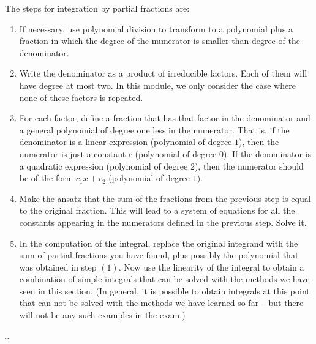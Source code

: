 \begin{remark}
The steps for integration by partial fractions are:
\begin{enumerate}[(1)]
	\item If necessary, use polynomial division to transform to a polynomial plus a fraction in which the degree of the numerator is smaller than degree of the denominator.
	\item Write the denominator as a product of irreducible factors. Each of them will have degree at most two. In this module, we only consider the case where none of these factors is repeated.
	\item For each factor, define a fraction that has that factor in the denominator and a general polynomial of degree one less in the numerator. That is, if the denominator is a linear expression (polynomial of degree $1$), then the numerator is just a constant $c$ (polynomial of degree $0$). If the denominator is a quadratic expression (polynomial of degree $2$), then the numerator should be of the form $c_1 x + c_2$ (polynomial of degree $1$).
	\item Make the ansatz that the sum of the fractions from the previous step is equal to the original fraction. This will lead to a system of equations for all the constants appearing in the numerators defined in the previous step. Solve it.
	\item In the computation of the integral, replace the original integrand with the sum of partial fractions you have found, plus possibly the polynomial that was obtained in step $(1)$. Now use the linearity of the integral to obtain a combination of simple integrals that can be solved with the methods we have seen in this section. (In general, it is possible to obtain integrals at this point that can not be solved with the methods we have learned so far -- but there will not be any such examples in the exam.) 
\end{enumerate}
\end{remark}


\begin{application}
\texttt{\ldots}
\end{application}

